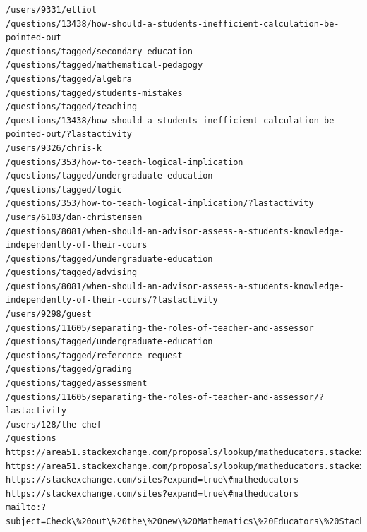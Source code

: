 \documentclass[11pt]{article}
\begin{document}
\begin{Verbatim}[commandchars=\\\{\}]
/users/9331/elliot
/questions/13438/how-should-a-students-inefficient-calculation-be-pointed-out
/questions/tagged/secondary-education
/questions/tagged/mathematical-pedagogy
/questions/tagged/algebra
/questions/tagged/students-mistakes
/questions/tagged/teaching
/questions/13438/how-should-a-students-inefficient-calculation-be-pointed-out/?lastactivity
/users/9326/chris-k
/questions/353/how-to-teach-logical-implication
/questions/tagged/undergraduate-education
/questions/tagged/logic
/questions/353/how-to-teach-logical-implication/?lastactivity
/users/6103/dan-christensen
/questions/8081/when-should-an-advisor-assess-a-students-knowledge-independently-of-their-cours
/questions/tagged/undergraduate-education
/questions/tagged/advising
/questions/8081/when-should-an-advisor-assess-a-students-knowledge-independently-of-their-cours/?lastactivity
/users/9298/guest
/questions/11605/separating-the-roles-of-teacher-and-assessor
/questions/tagged/undergraduate-education
/questions/tagged/reference-request
/questions/tagged/grading
/questions/tagged/assessment
/questions/11605/separating-the-roles-of-teacher-and-assessor/?lastactivity
/users/128/the-chef
/questions
https://area51.stackexchange.com/proposals/lookup/matheducators.stackexchange.com
https://area51.stackexchange.com/proposals/lookup/matheducators.stackexchange.com
https://stackexchange.com/sites?expand=true\#matheducators
https://stackexchange.com/sites?expand=true\#matheducators
mailto:?subject=Check\%20out\%20the\%20new\%20Mathematics\%20Educators\%20Stack\%20Exchange\%20Q\%26A\%20site\%20from\%20Stack\%20Exchange\&body=Hi!\%0d\%0a\%0d\%0aI\%27m\%20supporting\%20a\%20new\%20Q\%26A\%20website\%20for\%20those\%20involved\%20in\%20the\%20field\%20of\%20teaching\%20mathematics.\%0d\%0a\%0d\%0aIt\%27s\%20built\%20on\%20the\%20same\%20software\%20as\%20stackoverflow.com\%2c\%20a\%20hugely\%20popular\%20site\%20where\%20over\%20seven\%20million\%20programmers\%20help\%20each\%20other\%20with\%20difficult\%20programming\%20problems.\%20On\%20Stack\%20Overflow\%20the\%20audience\%20votes\%20for\%20the\%20best\%20answer\%2c\%20so\%20the\%20answer\%20you\%20want\%20is\%20usually\%20right\%20at\%20the\%20top\%2c\%20not\%20on\%20page\%20five.\%0d\%0a\%0d\%0aI\%27m\%20hoping\%20that\%20a\%20site\%20for\%20those\%20involved\%20in\%20the\%20field\%20of\%20teaching\%20mathematics\%20would\%20have\%20the\%20same\%20kind\%20of\%20network\%20effect\%20and\%20turn\%20into\%20an\%20amazing\%20resource.\%0d\%0a\%0d\%0aThe\%20public\%20beta\%20is\%20going\%20on\%20here\%2c\%20if\%20you\%27re\%20interested\%20in\%20participating\%3a\%0d\%0a\%0d\%0ahttps\%3a\%2f\%2fmatheducators.stackexchange.com\%0d\%0a\%0d\%0aThanks!

\end{Verbatim}
\end{document}
